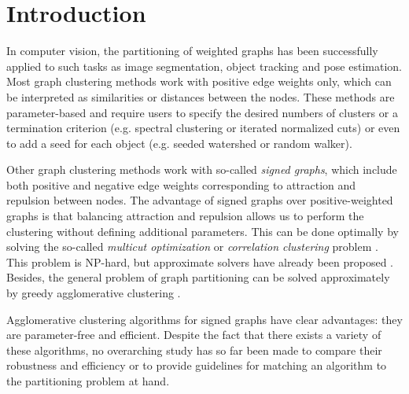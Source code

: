 
\section{Introduction}
In computer vision, the partitioning of weighted graphs has been successfully applied to such tasks as image segmentation, object tracking and pose estimation. %
Most graph clustering methods work with positive edge weights only, which can be interpreted as similarities or distances between the nodes. These methods are parameter-based and require users to specify the desired numbers of clusters or a termination criterion (e.g. spectral clustering or iterated normalized cuts) or even to add a seed for each object  (e.g. seeded watershed or random walker).  

Other graph clustering methods work with so-called \emph{signed graphs}, which include both positive and negative edge weights corresponding to attraction and repulsion between nodes. The advantage of signed graphs over positive-weighted graphs is that balancing attraction and repulsion allows us to perform the clustering without defining additional parameters. This can be done optimally by solving the so-called \emph{multicut optimization} or \emph{correlation clustering} problem \cite{kappes2011globally,chopra1991multiway}. This problem is NP-hard, but approximate solvers have already been proposed \cite{beier2016efficient}. Besides, the general problem of graph partitioning can be solved approximately by greedy agglomerative clustering \cite{keuper2015efficient,levinkov2017comparative,wolf2018mutex,kardoostsolving}. 


Agglomerative clustering algorithms for signed graphs have clear advantages: they are parameter-free and efficient. Despite the fact that there exists a variety of these algorithms, no overarching study has so far been made to compare their robustness and efficiency or to provide guidelines for matching an algorithm to the partitioning problem at hand. 


